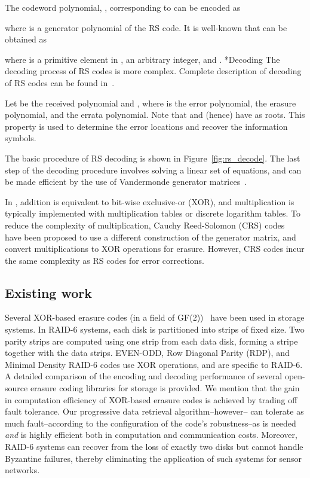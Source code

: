 \documentclass[10pt,journal,letterpaper,compsoc]{IEEEtran}
\makeatletter
\newcommand{\0}{{\bf 0}}
\newcounter{step}
\renewcommand\paragraph{\@startsection{paragraph}{4}{\z@}{1.5ex plus .2ex minus .3ex}{-0em}{\normalsize\bf}}
\makeatother
\begin{document}
The codeword polynomial, , corresponding to  can be
encoded as

where  is a generator polynomial of the RS code. It is
well-known that  can be obtained as

where  is a primitive element in ,  an arbitrary integer, and .
\paragraph*{Decoding}
The decoding process of RS codes is more complex. Complete description of decoding of RS codes can be found
in~\cite{MOO05}.

Let  be the received polynomial and
, where  is the error polynomial,   the erasure polynomial, and
  the
errata polynomial. Note that  and (hence)  have
 as roots. This property is used
to determine the error locations and recover the information symbols.

The basic procedure of RS decoding is shown in Figure~\ref{fig:rs_decode}. The
last step of the decoding procedure involves solving a linear set of equations,
and can be made efficient by the use of Vandermonde generator matrices~\cite{william1988numerical}.


In , addition is equivalent to bit-wise exclusive-or (XOR), and
multiplication is typically implemented with multiplication tables or discrete
logarithm tables.  To reduce the complexity of multiplication, Cauchy
Reed-Solomon (CRS) codes~\cite{Blomer95anxor-based} have been proposed to use a different
construction of the generator matrix, and convert multiplications to XOR
operations for erasure.  However, CRS codes incur the same complexity as RS codes for
error corrections. 
\subsection{Existing work}
Several XOR-based erasure codes (in a field of
GF(2))~\cite{corbett4rdp,blaum1999ldm,blaum:eca,lin2007dpl} have been used in
storage systems.  In RAID-6 systems, each disk is partitioned into strips of
fixed size. Two parity strips are computed using one strip from each data disk,
forming a stripe together with the data strips.  EVEN-ODD\cite{blaum:eca}, Row
Diagonal Parity (RDP)\cite{corbett4rdp}, and Minimal Density RAID-6
codes\cite{blaum1999ldm}  use XOR operations, and are specific to RAID-6.
A detailed comparison of the encoding and decoding
performance of several open-source erasure coding libraries for storage is provided\cite{Plank09}.
We mention that the gain in computation efficiency of XOR-based erasure codes is achieved by
trading off fault tolerance. 
Our progressive data retrieval algorithm--however--
can tolerate as much fault--according to the configuration of the code's robustness--as is needed 
\emph{and} is highly efficient both in computation and communication costs.
Moreover, RAID-6 systems can recover from the loss of
exactly two disks but cannot handle Byzantine failures, thereby eliminating the application of such
systems for sensor networks. 
\end{document}
